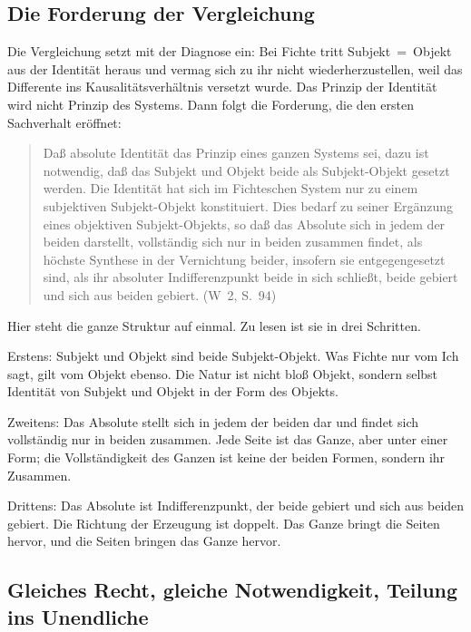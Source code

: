 \documentclass[11pt,a4paper]{article}
\newcommand{\SO}{Subjekt-Objekt}
\newcommand{\Werke}[1]{(W~2, S.~#1)}
\begin{document}
\subsection{Die Forderung der Vergleichung}

Die Vergleichung setzt mit der Diagnose ein: Bei Fichte tritt Subjekt~=~Objekt aus der Identität heraus und vermag sich zu ihr nicht wiederherzustellen, weil das Differente ins Kausalitätsverhältnis versetzt wurde. Das Prinzip der Identität wird nicht Prinzip des Systems. Dann folgt die Forderung, die den ersten Sachverhalt eröffnet:

\begin{quote}
\glqq Daß absolute Identität das Prinzip eines ganzen Systems sei, dazu ist notwendig, daß das Subjekt und Objekt beide als \SO{} gesetzt werden. Die Identität hat sich im Fichteschen System nur zu einem subjektiven \SO{} konstituiert. Dies bedarf zu seiner Ergänzung eines objektiven \SO{}s, so daß das Absolute sich in jedem der beiden darstellt, vollständig sich nur in beiden zusammen findet, als höchste Synthese in der Vernichtung beider, insofern sie entgegengesetzt sind, als ihr absoluter Indifferenzpunkt beide in sich schließt, beide gebiert und sich aus beiden gebiert.\grqq{} \Werke{94}
\end{quote}

Hier steht die ganze Struktur auf einmal. Zu lesen ist sie in drei Schritten.

Erstens: Subjekt und Objekt sind beide \SO{}. Was Fichte nur vom Ich sagt, gilt vom Objekt ebenso. Die Natur ist nicht bloß Objekt, sondern selbst Identität von Subjekt und Objekt in der Form des Objekts.

Zweitens: Das Absolute stellt sich in jedem der beiden dar und findet sich vollständig nur in beiden zusammen. Jede Seite ist das Ganze, aber unter einer Form; die Vollständigkeit des Ganzen ist keine der beiden Formen, sondern ihr Zusammen.

Drittens: Das Absolute ist Indifferenzpunkt, der beide gebiert und sich aus beiden gebiert. Die Richtung der Erzeugung ist doppelt. Das Ganze bringt die Seiten hervor, und die Seiten bringen das Ganze hervor.

\subsection{Gleiches Recht, gleiche Notwendigkeit, Teilung ins Unendliche}
\end{document}
